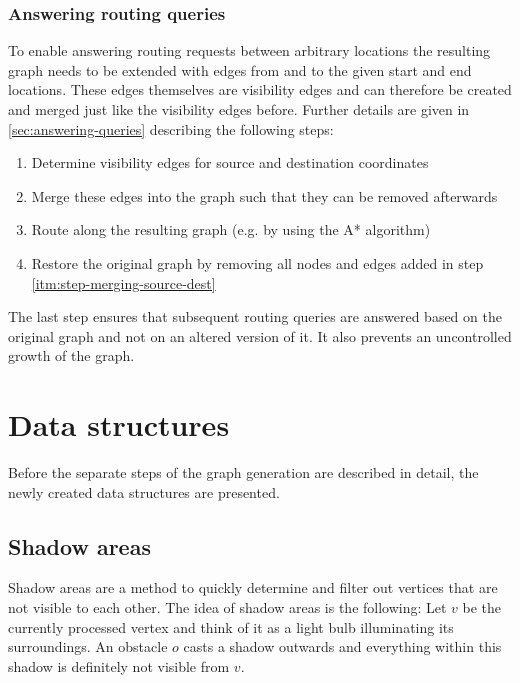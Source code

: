 		\subsubsection{Answering routing queries}
		
			To enable answering routing requests between arbitrary locations the resulting graph needs to be extended with edges from and to the given start and end locations.
			These edges themselves are visibility edges and can therefore be created and merged just like the visibility edges before.
			Further details are given in \cref{sec:answering-queries} describing the following steps:
			\begin{enumerate}
				\item Determine visibility edges for source and destination coordinates\label{itm:step-merging-source-dest}
				\item Merge these edges into the graph such that they can be removed afterwards
				\item Route along the resulting graph (e.g. by using the A* algorithm)
				\item Restore the original graph by removing all nodes and edges added in step \ref{itm:step-merging-source-dest}
			\end{enumerate}
			The last step ensures that subsequent routing queries are answered based on the original graph and not on an altered version of it.
			It also prevents an uncontrolled growth of the graph.
	
\section{Data structures}
	
	Before the separate steps of the graph generation are described in detail, the newly created data structures are presented.
		
	\subsection{Shadow areas}
	\label{subsec:shadow-areas}
		
		Shadow areas are a method to quickly determine and filter out vertices that are not visible to each other.
		The idea of shadow areas is the following:
		Let $v$ be the currently processed vertex and think of it as a light bulb illuminating its surroundings.
		An obstacle $o$ casts a shadow outwards and everything within this shadow is definitely not visible from $v$.
		
